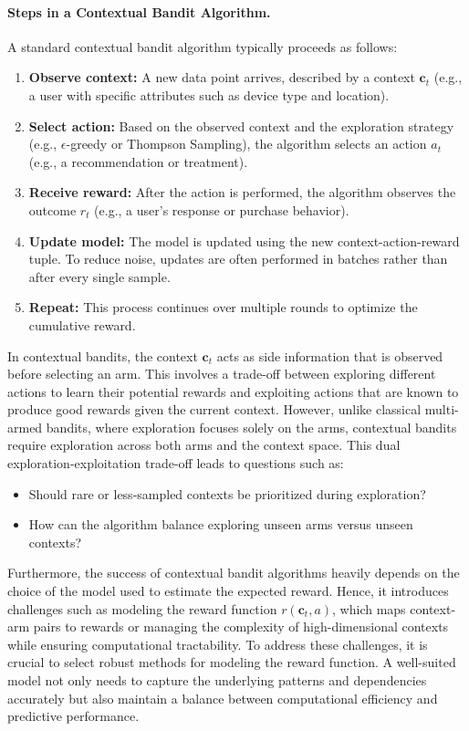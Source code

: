 \paragraph{Steps in a Contextual Bandit Algorithm.}
A standard contextual bandit algorithm typically proceeds as follows:
\begin{enumerate}
    \item \textbf{Observe context:} A new data point arrives, described by a context $\mathbf{c}_t$ (e.g., a user with specific attributes such as device type and location).
    \item \textbf{Select action:} Based on the observed context and the exploration strategy (e.g., $\epsilon$-greedy or Thompson Sampling), the algorithm selects an action $a_t$ (e.g., a recommendation or treatment).
    \item \textbf{Receive reward:} After the action is performed, the algorithm observes the outcome $r_t$ (e.g., a user's response or purchase behavior).
    \item \textbf{Update model:} The model is updated using the new context-action-reward tuple. To reduce noise, updates are often performed in batches rather than after every single sample.
    \item \textbf{Repeat:} This process continues over multiple rounds to optimize the cumulative reward.
\end{enumerate}

In contextual bandits, the context $\mathbf{c}_t$ acts as side information that is observed before selecting an arm. This involves a trade-off between exploring different actions to learn their potential rewards and exploiting actions that are known to produce good rewards given the current context. However, unlike classical multi-armed bandits, where exploration focuses solely on the arms, contextual bandits require exploration across both arms and the context space. This dual exploration-exploitation trade-off leads to questions such as:
\begin{itemize}
    \item Should rare or less-sampled contexts be prioritized during exploration?
    \item How can the algorithm balance exploring unseen arms versus unseen contexts?
\end{itemize}
Furthermore, the success of contextual bandit algorithms heavily depends on the choice of the model used to estimate the expected reward. Hence, it introduces challenges such as modeling the reward function $r(\mathbf{c}_t, a)$, which maps context-arm pairs to rewards or managing the complexity of high-dimensional contexts while ensuring computational tractability. To address these challenges, it is crucial to select robust methods for modeling the reward function. A well-suited model not only needs to capture the underlying patterns and dependencies accurately but also maintain a balance between computational efficiency and predictive performance.

